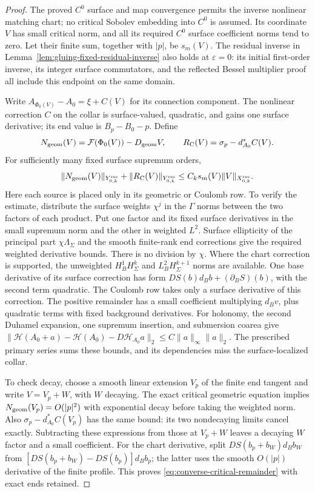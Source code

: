 \documentclass[11pt]{amsart}
\theoremstyle{definition}
\theoremstyle{remark}
\theoremstyle{plain}
\begin{document}
\begin{proof}
The proved $C^0$ surface and map convergence permits the inverse
nonlinear matching chart; no critical Sobolev embedding into
$C^0$ is assumed. Its coordinate $V$ has small critical norm,
and all its required $C^0$ surface coefficient norms tend to
zero. Let their finite sum, together with $|p|$, be $s_m(V)$.
The residual inverse in
Lemma~\ref{lem:gluing-fixed-residual-inverse} also holds at
$\varepsilon=0$: its initial first-order inverse, its integer
surface commutators, and the reflected Bessel multiplier proof
all include this endpoint on the same domain.

Write $A_{\Phi_0(V)}-A_0=\xi+C(V)$ for its connection component.
The nonlinear correction $C$ on the collar is surface-valued,
quadratic, and gains one surface derivative; its end value is
$B_p-B_0-p$. Define
\[
 N_{\rm geom}(V)=\mathcal F(\Phi_0(V))-D_{\rm geom}V,\qquad
 R_{\rm C}(V)=\sigma_p-d_{A_0}^*C(V).
\]
For sufficiently many fixed surface supremum orders,
\begin{equation}\label{eq:converse-critical-remainder}
 \|N_{\rm geom}(V)\|_{Y^{\rm res}_{0,k}}
       +\|R_{\rm C}(V)\|_{Y^{\rm res}_{0,k}}
                 \leq C_ks_m(V)\|V\|_{X^{\rm res}_{0,k}}.
\end{equation}
Here each source is placed only in its geometric or Coulomb row.
To verify the estimate, distribute the surface weights
$\chi^j$ in the $\Gamma$ norms between the two factors
of each product. Put one factor and its fixed surface derivatives
in the small supremum norm and the other in weighted $L^2$.
Surface ellipticity of the principal part $\chi\Lambda_\Sigma$
and the smooth finite-rank end corrections give the required
weighted derivative bounds. There is no division by $\chi$.
Where the chart correction is supported, the unweighted
$H_B^1H_\Sigma^k$ and $L_B^2H_\Sigma^{k+1}$ norms are available.
One base derivative of its surface correction has form
$DS(b)d_Bb+(\partial_BS)(b)$, with the second term quadratic.
The Coulomb row takes only a surface derivative of this correction.
The positive remainder has a small coefficient multiplying
$d_Bv$, plus quadratic terms with fixed background derivatives.
For holonomy, the second Duhamel expansion, one supremum
insertion, and submersion coarea give
$\|\mathcal H(A_0+a)-\mathcal H(A_0)-D\mathcal H_{A_0}a\|_2
\leq C\|a\|_\infty\|a\|_2$.
The prescribed primary series sums these bounds, and its
dependencies miss the surface-localized collar.

To check decay, choose a smooth linear extension $V_p$ of
the finite end tangent and write $V=V_p+W$, with $W$ decaying.
The exact critical geometric equation implies
$N_{\rm geom}(V_p)=O(|p|^2)$ with exponential decay before
taking the weighted norm. Also
$\sigma_p-d_{A_0}^*C(V_p)$ has the same bound: its two
nondecaying limits cancel exactly. Subtracting these expressions
from those at $V_p+W$ leaves a decaying $W$ factor and a
small coefficient. For the chart derivative, split
$DS(b_p+b_W)d_Bb_W$ from
$[DS(b_p+b_W)-DS(b_p)]d_Bb_p$; the latter uses the smooth
$O(|p|)$ derivative of the finite profile. This proves
\eqref{eq:converse-critical-remainder} with exact ends retained.


\end{proof}
\end{document}
